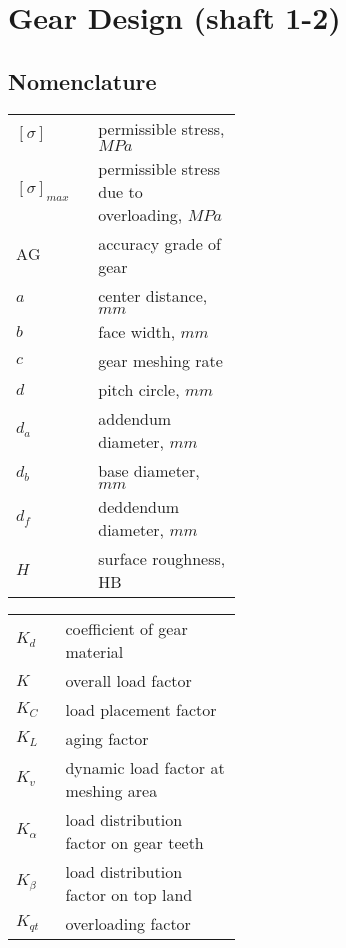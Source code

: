 \chapter{Gear Design (shaft 1-2)}
\section*{Nomenclature}
\begin{tabular}[t]{p{0.1\linewidth}p{0.35\linewidth}}
	$ [\sigma] $ & permissible stress, $ \unit{MPa} $\\
	$ [\sigma]_{max} $ & permissible stress due to overloading, $ \unit{MPa} $\\
	$ \text{AG} $ & accuracy grade of gear\\
	$ a $ & center distance, $ \unit{mm} $\\
	$ b $ & face width, $ \unit{mm} $\\
	$ c $ & gear meshing rate\\
	$ d $ & pitch circle, $ \unit{mm} $\\
	$ d_a $ & addendum diameter, $ \unit{mm} $\\
	$ d_b $ & base diameter, $ \unit{mm} $\\
	$ d_f $ & deddendum diameter, $ \unit{mm} $\\
	$ H $ & surface roughness, HB\\
\end{tabular}
\begin{tabular}[t]{p{0.05\linewidth}p{0.4\linewidth}}
	$ K_d $ & coefficient of gear material\\	
	$ K $ & overall load factor\\
	$ K_{C} $ & load placement factor\\
	$ K_{L} $ & aging factor\\
	$ K_{v} $ & dynamic load factor at meshing area\\
	$ K_{\alpha} $ & load distribution factor on gear teeth\\
	$ K_{\beta} $ & load distribution factor on top land\\
	$ K_{qt} $ & overloading factor\\
\end{tabular}\newpage

